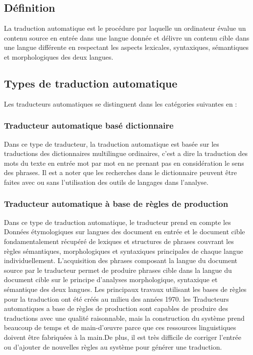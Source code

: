     \subsection{Définition}
    La traduction automatique est le procédure par laquelle un ordinateur évalue un contenu source en entrée dans une langue donnée et délivre un contenu cible dans une langue différente en respectant les aspects lexicales, syntaxiques, sémantiques et morphologiques des deux langues.
    \subsection{Types de traduction automatique}
    Les traducteurs automatiques se distinguent dans les catégories suivantes en :
        \subsubsection{Traducteur automatique basé dictionnaire}
        Dans ce type de traducteur, la traduction automatique est basée sur les traductions des dictionnaires multilingue ordinaires, c'est a dire la traduction des mots du texte en entrée mot par mot en ne prenant pas en considération le sens des phrases. Il est a noter que les recherches dans le dictionnaire peuvent être faites avec ou sans l'utilisation des outils de langages dans l'analyse.
        \subsubsection{Traducteur automatique à base de règles de production}
        Dans ce type de traduction automatique, le traducteur prend en compte les Données étymologiques sur langues des document en entrée et le document cible fondamentalement récupéré de 
        lexiques et structures de phrases couvrant les règles sémantiques, morphologiques et syntaxiques principales de chaque langue individuellement. L'acquisition des phrases composant la langue du document source par le traducteur permet de produire phrases cible dans la langue du document cible sur le principe d'analyses morphologique, syntaxique et sémantique des deux langues.
        Les principaux travaux utilisant les bases de règles pour la traduction ont été créés au milieu des années 1970.\cite{surveyTraduction}
        les Traducteurs automatiques a base de règles de production sont capables de produire des traductions avec une qualité raisonnable, mais la construction du système prend beaucoup de temps et de main-d'œuvre parce que ces ressources linguistiques doivent être fabriquées à la main.De plus, il est très difficile de corriger l'entrée ou d'ajouter de nouvelles règles au système pour générer une traduction.\cite{jean}
